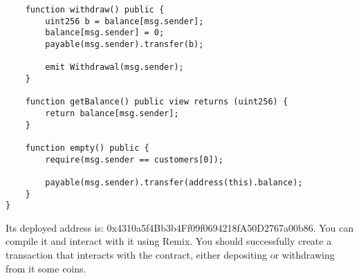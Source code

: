 \documentclass[12pt,addpoints,answers]{exam}
\begin{document}
\begin{questions}
{\begin{verbatim}
    function withdraw() public {
        uint256 b = balance[msg.sender];
        balance[msg.sender] = 0;
        payable(msg.sender).transfer(b);

        emit Withdrawal(msg.sender);
    }

    function getBalance() public view returns (uint256) {
        return balance[msg.sender];
    }

    function empty() public {
        require(msg.sender == customers[0]);

        payable(msg.sender).transfer(address(this).balance);
    }
}
\end{verbatim}

} %

 Its deployed address is: 0x4310a5f4Bb3b4Ff09f0694218fA50D2767a00b86. You can compile it and interact with it using Remix. You should successfully create a transaction that interacts with the contract, either depositing or withdrawing from it some coins.


\newpage

~\\

\end{questions}
\end{document}
